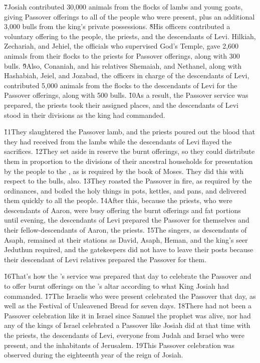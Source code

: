 \v{7}Josiah contributed 30,000 animals from the flocks of lambs and young goats, giving Passover offerings to all of the people who were present, plus an additional 3,000 bulls from the king's private possessions. \v{8}His officers contributed a voluntary offering to the people, the priests, and the descendants of Levi. Hilkiah, Zechariah, and Jehiel, the officials who supervised God's Temple, gave 2,600 animals from their flocks to the priests for Passover offerings, along with 300 bulls. \v{9}Also, Conaniah, and his relatives Shemaiah, and Nethanel, along with Hashabiah, Jeiel, and Jozabad, the officers in charge of the descendants of Levi, contributed 5,000 animals from the flocks to the descendants of Levi for the Passover offerings, along with 500 bulls. \v{10}As a result, the Passover service was prepared, the priests took their assigned places, and the descendants of Levi stood in their divisions as the king had commanded.

\v{11}They slaughtered the Passover lamb, and the priests poured out the blood that they had received from the lambs while the descendants of Levi flayed the sacrifices. \v{12}They set aside in reserve the burnt offerings, so they could distribute them in proportion to the divisions of their ancestral households for presentation by the people to the , as is required by the book of Moses. They did this with respect to the bulls, also. \v{13}They roasted the Passover in fire, as required by the ordinances, and boiled the holy things in pots, kettles, and pans, and delivered them quickly to all the people. \v{14}After this, because the priests, who were descendants of Aaron, were busy offering the burnt offerings and fat portions until evening, the descendants of Levi prepared the Passover for themselves and their fellow-descendants of Aaron, the priests. \v{15}The singers, as descendants of Asaph, remained at their stations as David, Asaph, Heman, and the king's seer Jeduthun required, and the gatekeepers did not have to leave their posts because their descendant of Levi relatives prepared the Passover for them.

\v{16}That's how the 's service was prepared that day to celebrate the Passover and to offer burnt offerings on the 's altar according to what King Josiah had commanded. \v{17}The Israelis who were present celebrated the Passover that day, as well as the Festival of Unleavened Bread for seven days. \v{18}There had not been a Passover celebration like it in Israel since Samuel the prophet was alive, nor had any of the kings of Israel celebrated a Passover like Josiah did at that time with the priests, the descendants of Levi, everyone from Judah and Israel who were present, and the inhabitants of Jerusalem. \v{19}This Passover celebration was observed during the eighteenth year of the reign of Josiah.

